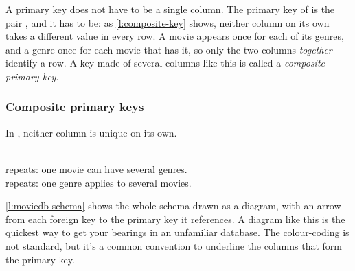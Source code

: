 A primary key does not have to be a single column.
The primary key of  is the pair , and it has to be: as \autoref{l:composite-key} shows, neither column on its own takes a different value in every row.
A movie appears once for each of its genres, and a genre once for each movie that has it, so only the two columns \emph{together} identify a row.
A key made of several columns like this is called a \emph{composite primary key}.

\begin{frame}
    \label{s:composite-key}
    \frametitle{Composite primary keys}
    In , neither column is unique on its own.
    \par\vspace{0.6em}
    {\footnotesize\centering
    \par}
    \vspace{0.75cm}
    \\[0.5em]
     repeats: one movie can have several genres.\\
     repeats: one genre applies to several movies.\\[0.5em]%
\end{frame}
\label{l:composite-key}

\autoref{l:moviedb-schema} shows the whole schema drawn as a diagram, with an arrow from each foreign key to the primary key it references.
A diagram like this is the quickest way to get your bearings in an unfamiliar database.
The colour-coding is not standard, but it's a common convention to underline the columns that form the primary key.

